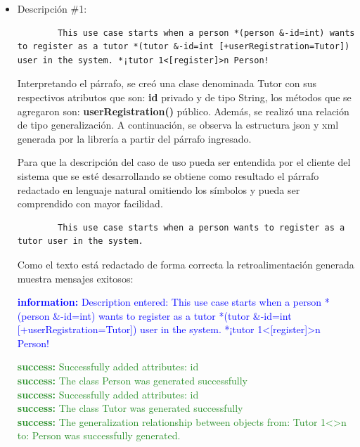 \begin{itemize}
	\item Descripción \#1:
	\begin{lstlisting}
		This use case starts when a person *(person &-id=int) wants to register as a tutor *(tutor &-id=int [+userRegistration=Tutor]) user in the system. *¡tutor 1<[register]>n Person! \end{lstlisting}

	Interpretando el párrafo, se creó una clase denominada Tutor con sus respectivos atributos que son: \textbf{id} privado y de tipo String, los métodos que se agregaron son: \textbf{userRegistration()} público. Además, se realizó una relación de tipo generalización. A continuación, se observa la estructura json y xml generada por la librería a partir del párrafo ingresado.




Para que la descripción del caso de uso pueda ser entendida por el cliente del sistema que se esté desarrollando se obtiene como resultado el párrafo redactado en lenguaje natural omitiendo los símbolos y pueda ser comprendido con mayor facilidad.

	
	\begin{lstlisting}
		This use case starts when a person wants to register as a tutor user in the system.  \end{lstlisting}
	
	Como el texto está redactado de forma correcta la retroalimentación generada muestra mensajes exitosos:
	
	\textcolor{blue}{\textbf{information:} Description entered: This use case starts when a person *(person \&-id=int) wants to register as a tutor *(tutor \&-id=int [+userRegistration=Tutor]) user in the system. *¡tutor 1<[register]>n Person!}
	
	\textcolor{ForestGreen}{
		\textbf{success:} Successfully added attributes: id \\
		\textbf{success:} The class Person was generated successfully \\
		\textbf{success:} Successfully added attributes: id \\
		\textbf{success:} The class Tutor was generated successfully \\
		\textbf{success:} The generalization relationship between objects from: Tutor 1<>n to: Person was successfully generated. }
	

\end{itemize}
